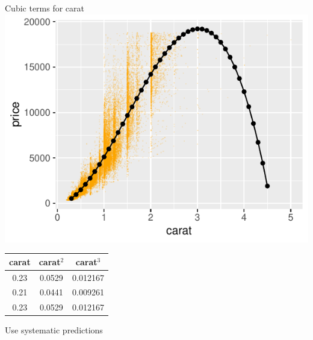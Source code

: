 \documentclass[
    utf8,
    aspectratio=169
]{beamer}  %
\begin{document}
\begin{frame}
\begin{columns}
		\begin{block}{\centering Cubic terms for carat}
			\includegraphics[width=1\textwidth]{pics/nonlinear.pdf}
			\vspace{-9em}
			\begin{scriptsize}
				\begin{table}
					\raggedleft
					\begin{tabular}{ccc}
						carat & carat$^2$ & carat$^3$ \\
								\hline
						 0.23       &            0.0529       &          0.012167\\
						 0.21       &            0.0441       &          0.009261\\
						 0.23       &            0.0529       &          0.012167\\
					\hline
					\end{tabular}
				\end{table}
			\end{scriptsize}
			\vspace{3em}
			\centering Use systematic predictions
		\end{block}
	\end{columns}
\end{frame}
\end{document}
